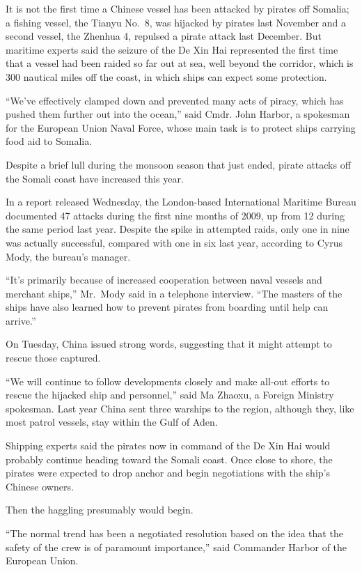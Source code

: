 ﻿\documentclass[12pt]{article}
\begin{document}
It is not the first time a Chinese vessel has been attacked by pirates off Somalia; a fishing
vessel, the Tianyu No.~8, was hijacked by pirates last November and a second vessel, the Zhenhua 4,
repulsed a pirate attack last December. But maritime experts said the seizure of the De Xin Hai
represented the first time that a vessel had been raided so far out at sea, well beyond the
corridor, which is 300 nautical miles off the coast, in which ships can expect some protection.

``We've effectively clamped down and prevented many acts of piracy, which has pushed them further
out into the ocean,'' said Cmdr. John Harbor, a spokesman for the European Union Naval Force, whose
main task is to protect ships carrying food aid to Somalia.

Despite a brief lull during the monsoon season that just ended, pirate attacks off the Somali coast
have increased this year.

In a report released Wednesday, the London-based International Maritime Bureau documented 47 attacks
during the first nine months of 2009, up from 12 during the same period last year. Despite the spike
in attempted raids, only one in nine was actually successful, compared with one in six last year,
according to Cyrus Mody, the bureau's manager.

``It's primarily because of increased cooperation between naval vessels and merchant ships,''
Mr.~Mody said in a telephone interview. ``The masters of the ships have also learned how to prevent
pirates from boarding until help can arrive.''

On Tuesday, China issued strong words, suggesting that it might attempt to rescue those captured.

``We will continue to follow developments closely and make all-out efforts to rescue the hijacked
ship and personnel,'' said Ma Zhaoxu, a Foreign Ministry spokesman. Last year China sent three
warships to the region, although they, like most patrol vessels, stay within the Gulf of Aden.

Shipping experts said the pirates now in command of the De Xin Hai would probably continue heading
toward the Somali coast. Once close to shore, the pirates were expected to drop anchor and begin
negotiations with the ship's Chinese owners.

Then the haggling presumably would begin.

``The normal trend has been a negotiated resolution based on the idea that the safety of the crew is
of paramount importance,'' said Commander Harbor of the European Union.
\end{document}
